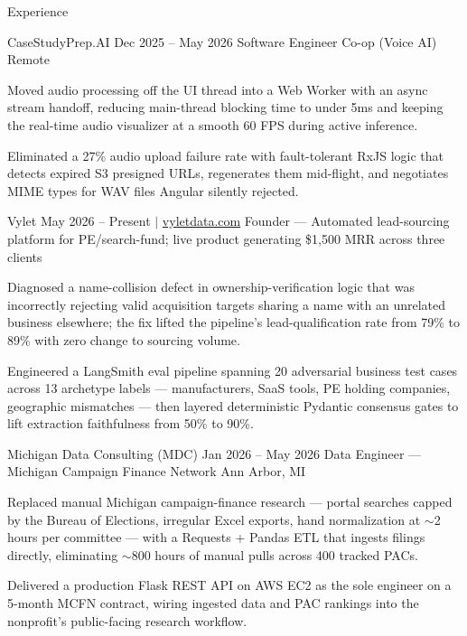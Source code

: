 \documentclass[
	11pt
]{../../../template}
\begin{document}
	\begin{rSection}{E}{xperience}
		\begin{rSectionEntry}
			{CaseStudyPrep.AI}
			{Dec 2025 -- May 2026}
			{Software Engineer Co-op (Voice AI)}
			{}
			{Remote}

			\item Moved audio processing off the UI thread into a Web Worker with an async stream handoff, reducing main-thread blocking time to under 5ms and keeping the real-time audio visualizer at a smooth 60 FPS during active inference.
			\item Eliminated a 27\% audio upload failure rate with fault-tolerant RxJS logic that detects expired S3 presigned URLs, regenerates them mid-flight, and negotiates MIME types for WAV files Angular silently rejected.
		\end{rSectionEntry}

		\begin{rSectionEntry}
			{Vylet}
			{May 2026 -- Present $\vert$ \href{https://vyletdata.com}{vyletdata.com}}
			{Founder --- Automated lead-sourcing platform for PE/search-fund; live product generating \$1,500 MRR across three clients}
			{}
			{}

			\item Diagnosed a name-collision defect in ownership-verification logic that was incorrectly rejecting valid acquisition targets sharing a name with an unrelated business elsewhere; the fix lifted the pipeline's lead-qualification rate from 79\% to 89\% with zero change to sourcing volume.
			\item Engineered a LangSmith eval pipeline spanning 20 adversarial business test cases across 13 archetype labels --- manufacturers, SaaS tools, PE holding companies, geographic mismatches --- then layered deterministic Pydantic consensus gates to lift extraction faithfulness from 50\% to 90\%.
		\end{rSectionEntry}

		\begin{rSectionEntry}
			{Michigan Data Consulting (MDC)}
			{Jan 2026 -- May 2026}
			{Data Engineer --- Michigan Campaign Finance Network}
			{}
			{Ann Arbor, MI}

			\item Replaced manual Michigan campaign-finance research --- portal searches capped by the Bureau of Elections, irregular Excel exports, hand normalization at $\sim$2 hours per committee --- with a Requests + Pandas ETL that ingests filings directly, eliminating $\sim$800 hours of manual pulls across 400 tracked PACs.
			\item Delivered a production Flask REST API on AWS EC2 as the sole engineer on a 5-month MCFN contract, wiring ingested data and PAC rankings into the nonprofit's public-facing research workflow.
		\end{rSectionEntry}
	\end{rSection}
\end{document}
